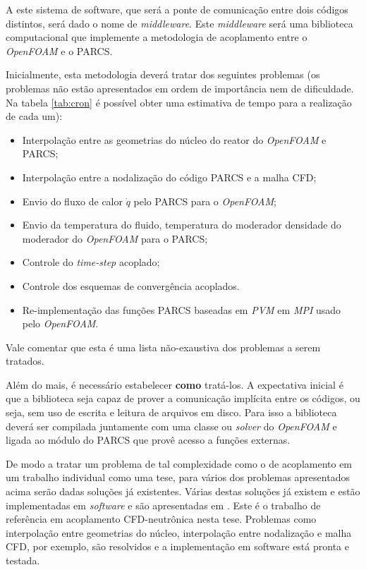 \documentclass[12pt,openright,twoside,a4paper,english,french,spanish,brazil]{abntex2}
\begin{document}
A este sistema de software, que será a ponte de comunicação entre dois códigos distintos, será dado o nome de  \textit{middleware}. 
Este \textit{middleware} será uma biblioteca computacional que implemente a metodologia de acoplamento entre o \textit{OpenFOAM} 
e o PARCS.

Inicialmente, esta metodologia deverá tratar dos seguintes problemas (os problemas não estão apresentados 
em ordem de importância nem de dificuldade. Na tabela \ref{tab:cron} é possível obter uma estimativa de tempo para 
a realização de cada um):

\begin{itemize}
\item Interpolação entre as geometrias do núcleo do reator do \textit{OpenFOAM} e PARCS;
\item Interpolação entre a nodalização do código PARCS e a malha CFD;
\item Envio do fluxo de calor $\dot q$ pelo PARCS para o \textit{OpenFOAM};
\item Envio da temperatura do fluido, temperatura do moderador densidade do moderador do \textit{OpenFOAM} para 
o PARCS;
\item Controle do \textit{time-step} acoplado;
\item Controle dos esquemas de convergência acoplados. 
\item Re-implementação das funções PARCS baseadas em \textit{PVM} \cite{Geist94} em \textit{MPI} \cite{Quinn2004} usado pelo \textit{OpenFOAM}.
\end{itemize}

Vale comentar que esta é uma lista não-exaustiva dos problemas a serem tratados.

Além do mais, é necessário estabelecer \textbf{como} tratá-los. A expectativa inicial 
é que a biblioteca seja capaz de prover a comunicação implícita entre os códigos, ou seja, sem uso de escrita 
e leitura de arquivos em disco. Para isso a biblioteca deverá ser compilada juntamente com uma classe ou 
\textit{solver} do \textit{OpenFOAM} e ligada ao módulo do PARCS que provê acesso a funções externas. 

De modo a tratar um problema de tal complexidade como o de acoplamento em um trabalho individual como uma tese, para 
vários dos problemas apresentados acima serão dadas soluções já existentes. Várias destas soluções já existem 
e estão implementadas em \textit{software} e são apresentadas em \cite{Monferrer2011a}. Este é o trabalho de referência 
em acoplamento CFD-neutrônica nesta tese. Problemas como interpolação entre geometrias do núcleo, interpolação 
entre nodalização e malha CFD, por exemplo, são resolvidos e a implementação em software está pronta e testada. 
\end{document}
